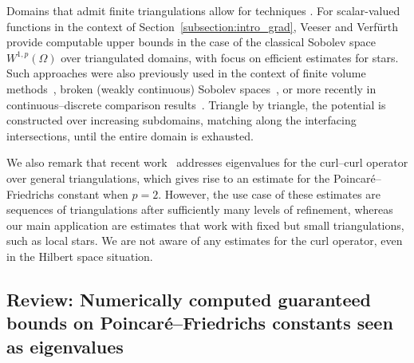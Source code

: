 Domains that admit finite triangulations allow for techniques . For scalar-valued functions in the context of Section~\ref{subsection:intro_grad}, Veeser and Verf\"urth~\cite{veeser2012poincare} provide computable upper bounds in the case of the classical Sobolev space $W^{1,p}(\Omega)$ over triangulated domains, with focus on efficient estimates for  stars. 
Such approaches were also previously used in the context of finite volume methods~\cite{Eym_Gal_Her_00}, broken (weakly continuous) Sobolev spaces~\cite{vohralik2005discrete}, or more recently in continuous--discrete comparison results~\cite{Brae_Pill_Sch_p_rob_09, ern2020stable, Chaum_Voh_p_rob_3D_H_curl_24,  Voh_loc_glob_H1_24}. Triangle by triangle, the potential is constructed over increasing subdomains, matching along the interfacing intersections, until the entire domain is exhausted.  

We also remark that recent work~\cite{gallistl2023computational} addresses eigenvalues for the curl--curl operator over general triangulations,
which gives rise to an estimate for the Poincar\'e--Friedrichs constant when $p=2$. However, the use case of these estimates are sequences of triangulations after sufficiently many levels of refinement, whereas our main application are estimates that work with fixed but small triangulations, such as local stars. 
We are not aware of any estimates for the curl operator, even in the Hilbert space situation. 

\subsection{Review: Numerically computed guaranteed bounds on Poincar\'e--Friedrichs constants seen as eigenvalues}

